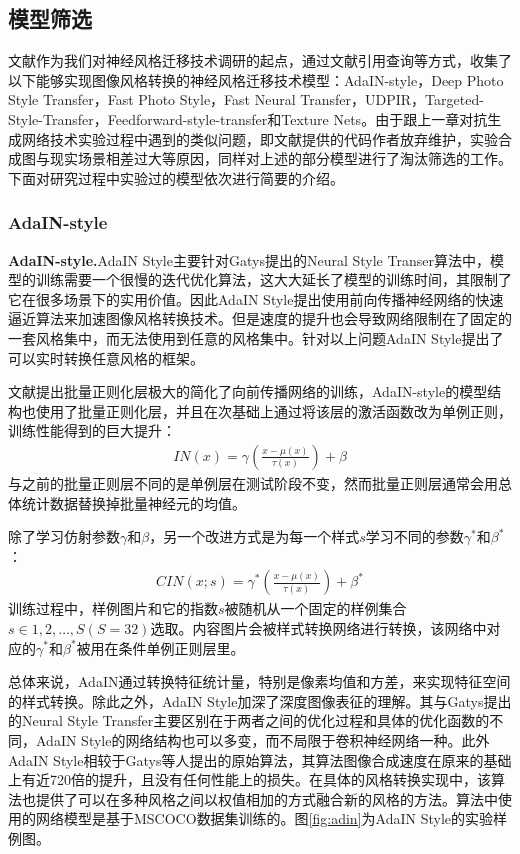 \subsection{模型筛选}

文献\cite{nst-survey}作为我们对神经风格迁移技术调研的起点，通过文献引用查询等方式，收集了以下能够实现图像风格转换的神经风格迁移技术模型：AdaIN-style\cite{adain}，Deep Photo Style Transfer\cite{dpst}，Fast Photo Style\cite{fps}，Fast Neural Transfer\cite{FNT}，UDPIR\cite{UDPIR}，Targeted-Style-Transfer\cite{Targeted-Style-Transfer}，Feedforward-style-transfer\cite{Feedforward-style-transfer}和Texture Nets\cite{texture-nets}。由于跟上一章对抗生成网络技术实验过程中遇到的类似问题，即文献提供的代码作者放弃维护，实验合成图与现实场景相差过大等原因，同样对上述的部分模型进行了淘汰筛选的工作。下面对研究过程中实验过的模型依次进行简要的介绍。


\subsubsection[AdaIN-style]{AdaIN-style}

\textbf{AdaIN-style.}\cite{adain}\quad AdaIN Style主要针对Gatys提出的Neural Style Transer算法中，模型的训练需要一个很慢的迭代优化算法，这大大延长了模型的训练时间，其限制了它在很多场景下的实用价值。因此AdaIN Style提出使用前向传播神经网络的快速逼近算法来加速图像风格转换技术。但是速度的提升也会导致网络限制在了固定的一套风格集中，而无法使用到任意的风格集中。针对以上问题AdaIN Style提出了可以实时转换任意风格的框架。

文献\cite{ioffe}提出批量正则化层极大的简化了向前传播网络的训练，AdaIN-style的模型结构也使用了批量正则化层，并且在次基础上通过将该层的激活函数改为单例正则，训练性能得到的巨大提升：
\begin{align}
    IN(x)=\gamma(\frac{x-\mu(x)}{\tau(x)})+\beta
\end{align}
与之前的批量正则层不同的是单例层在测试阶段不变，然而批量正则层通常会用总体统计数据替换掉批量神经元的均值。

除了学习仿射参数$\gamma$和$\beta$，另一个改进方式是为每一个样式$s$学习不同的参数$\gamma^*$和$\beta^*$：
\begin{align}
    CIN(x;s)=\gamma^*(\frac{x-\mu(x)}{\tau(x)})+\beta^*
\end{align}
训练过程中，样例图片和它的指数$s$被随机从一个固定的样例集合$s\in {1,2,\dots,S}(S=32)$选取。内容图片会被样式转换网络进行转换，该网络中对应的$\gamma^*$和$\beta^*$被用在条件单例正则层里。

总体来说，AdaIN通过转换特征统计量，特别是像素均值和方差，来实现特征空间的样式转换。除此之外，AdaIN Style加深了深度图像表征的理解。其与Gatys提出的Neural Style Transfer主要区别在于两者之间的优化过程和具体的优化函数的不同，AdaIN Style的网络结构也可以多变，而不局限于卷积神经网络一种。此外AdaIN Style相较于Gatys等人提出的原始算法，其算法图像合成速度在原来的基础上有近720倍的提升\cite{adin-github}，且没有任何性能上的损失。在具体的风格转换实现中，该算法也提供了可以在多种风格之间以权值相加的方式融合新的风格的方法。算法中使用的网络模型是基于MSCOCO\cite{mscoco}数据集训练的。图\ref{fig:adin}为AdaIN Style的实验样例图。

